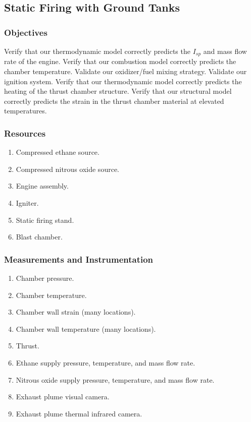 \documentclass{article}
\begin{document}
\subsection{Static Firing with Ground Tanks}
\subsubsection{Objectives}
Verify that our thermodynamic model correctly predicts the $I_{sp}$ and mass flow rate of the engine. Verify that our combustion model correctly predicts the chamber temperature. Validate our oxidizer/fuel mixing strategy. Validate our ignition system. Verify that our thermodynamic model correctly predicts the heating of the thrust chamber structure. Verify that our structural model correctly predicts the strain in the thrust chamber material at elevated temperatures.
\subsubsection{Resources}
\begin{enumerate}
\item Compressed ethane source.
\item Compressed nitrous oxide source.
\item Engine assembly.
\item Igniter.
\item Static firing stand.
\item Blast chamber.
\end{enumerate}
\subsubsection{Measurements and Instrumentation}
\begin{enumerate}
\item Chamber pressure.
\item Chamber temperature.
\item Chamber wall strain (many locations).
\item Chamber wall temperature (many locations).
\item Thrust.
\item Ethane supply pressure, temperature, and mass flow rate.
\item Nitrous oxide supply pressure, temperature, and mass flow rate.
\item Exhaust plume visual camera.
\item Exhaust plume thermal infrared camera.
\end{enumerate}
\end{document}
